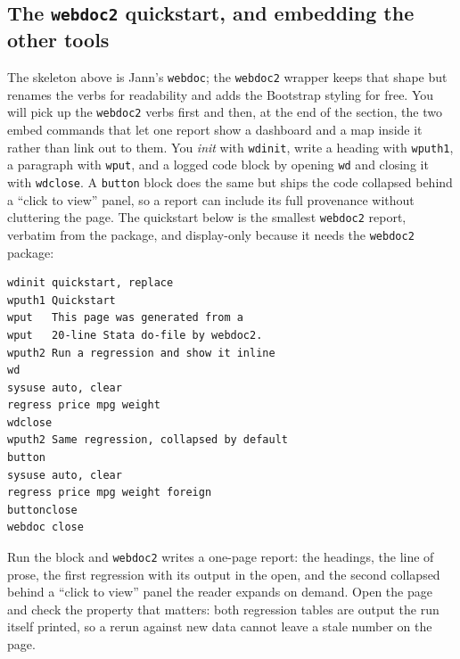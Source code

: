 \documentclass[
    a4paper,
    fontsize=10pt,
    twoside=true,
    numbers=noenddot,
]{kaobook}
\begin{document}
\subsection{The \texttt{webdoc2} quickstart, and embedding the other tools}
The skeleton above is Jann's \texttt{webdoc}; the \texttt{webdoc2} wrapper keeps that shape but renames the verbs for readability and adds the Bootstrap styling for free. You will pick up the \texttt{webdoc2} verbs first and then, at the end of the section, the two embed commands that let one report show a dashboard and a map inside it rather than link out to them. You \emph{init} with \texttt{wdinit}, write a heading with \texttt{wputh1}, a paragraph with \texttt{wput}, and a logged code block by opening \texttt{wd} and closing it with \texttt{wdclose}. A \texttt{button} block does the same but ships the code collapsed behind a \enquote{click to view} panel, so a report can include its full provenance without cluttering the page. The quickstart below is the smallest \texttt{webdoc2} report, verbatim from the package, and display-only because it needs the \texttt{webdoc2} package:
\par
{\footnotesize
\begin{verbatim}
wdinit quickstart, replace
wputh1 Quickstart
wput   This page was generated from a
wput   20-line Stata do-file by webdoc2.
wputh2 Run a regression and show it inline
wd
sysuse auto, clear
regress price mpg weight
wdclose
wputh2 Same regression, collapsed by default
button
sysuse auto, clear
regress price mpg weight foreign
buttonclose
webdoc close
\end{verbatim}
}
Run the block and \texttt{webdoc2} writes a one-page report: the headings, the line of prose, the first regression with its output in the open, and the second collapsed behind a \enquote{click to view} panel the reader expands on demand. Open the page and check the property that matters: both regression tables are output the run itself printed, so a rerun against new data cannot leave a stale number on the page.
\end{document}
